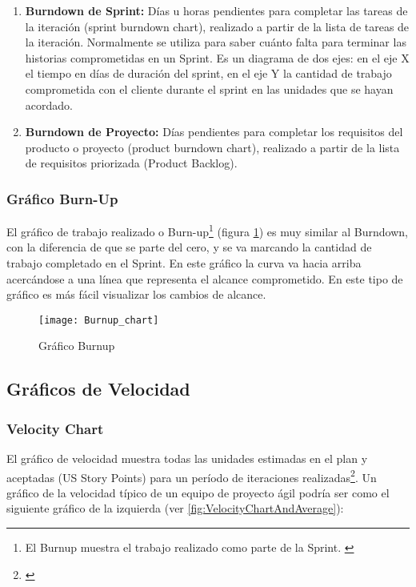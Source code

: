 \begin{enumerate}

\item \textbf{Burndown de Sprint:} Días u horas pendientes para completar las tareas de la iteración (sprint burndown chart), realizado a partir de la lista de tareas de la iteración. Normalmente se utiliza para saber cuánto falta para terminar las historias comprometidas en un Sprint. Es un diagrama de dos ejes: en el eje X el tiempo en días de duración del sprint, en el eje Y la cantidad de trabajo comprometida con el cliente durante el sprint en las unidades que se hayan acordado.

\item \textbf{Burndown de Proyecto:} Días pendientes para completar los requisitos del producto o proyecto (product burndown chart), realizado a partir de la lista de requisitos priorizada (Product Backlog).

\end{enumerate}

\subsubsection{Gráfico Burn-Up}

El gráfico de trabajo realizado o Burn-up\footnote{El Burnup muestra el trabajo realizado como parte de la Sprint. \cite{SBOK-2013}} (figura \ref{fig:Burnup_chart}) es muy similar al Burndown, con la diferencia de que se parte del cero, y se va marcando la cantidad de trabajo completado en el Sprint. En este gráfico la curva va hacia arriba acercándose a una línea que representa el alcance comprometido. En este tipo de gráfico es más fácil visualizar los cambios de alcance.

\begin{figure}[h]
  \centering
  \texttt{[image: Burnup\_chart]}
  \caption{Gráfico Burnup}
  \centering
  \label{fig:Burnup_chart} %
\end{figure}

\subsection{Gráficos de Velocidad}

\subsubsection{Velocity Chart}

El gráfico de velocidad muestra todas las unidades estimadas en el plan y aceptadas (US Story Points) para un período de iteraciones realizadas\footnote{\cite{Scrum-Alliance-2014}}. Un gráfico de la velocidad típico de un equipo de proyecto ágil podría ser como el siguiente gráfico de la izquierda (ver \ref{fig:VelocityChartAndAverage}):

